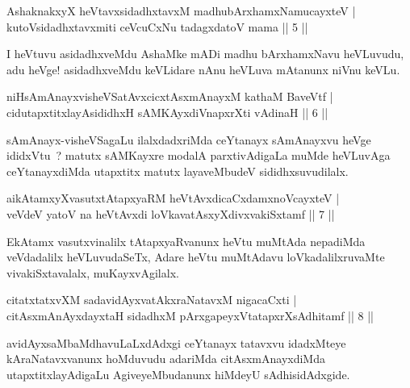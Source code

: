 
\begin{shl}
AshaknakxyX heVtavxsidadhxtavxM madhubArxhamxNamucayxteV |\\
kutoV\s sidadhxtavxmiti ceVcuCxNu tadagxdatoV mama \hfill || 5 ||
\end{shl}

\begin{artha}
I heVtuvu asidadhxveMdu AshaMke mADi madhu bArxhamxNavu heVLuvudu, adu heVge! asidadhxveMdu keVLidare nAnu heVLuva mAtanunx niVnu keVLu.
\end{artha}

\begin{shl}
niHsAmAnayxvisheVSatAvxcicxtAsxmAnayxM kathaM BaveVtf |\\
cidutapxtitxlayAsididhxH sAMKAyxdiVnapxrXti vAdinaH \hfill || 6 ||
\end{shl}

\begin{artha}
sAmAnayx-visheVSagaLu ilalxdadxriMda ceYtanayx sAmAnayxvu heVge ididxVtu~? matutx sAMKayxre modalA parxtivAdigaLa muMde heVLuvAga ceYtanayxdiMda utapxtitx matutx layaveMbudeV sididhxsuvudilalx.
\end{artha}

\begin{shl}
aikAtamxyXvasutxtAtapxyaRM heVtAvxdicaCxdamxnoVcayxteV |\\
veVdeV yatoV na heVtAvxdi loVkavatAsxyXdivxvakiSxtamf \hfill || 7 ||
\end{shl}

\begin{artha}
EkAtamx vasutxvinalilx tAtapxyaRvanunx heVtu muMtAda nepadiMda veVdadalilx heVLuvudaSeTx, Adare heVtu muMtAdavu loVkadalilxruvaMte vivakiSxtavalalx, muKayxvAgilalx.
\end{artha}

\begin{shl}
citatxtatxvXM sadavidAyxvatAkxraNatavxM nigacaCxti |\\
citAsxmAnAyxdayxtaH sidadhxM pArxgapeyxVtatapxrXsAdhitamf \hfill || 8 ||
\end{shl}

\begin{artha}
avidAyxsaMbaMdhavuLaLxdAdxgi ceYtanayx tatavxvu idadxMteye kAraNatavxvanunx hoMduvudu adariMda citAsxmAnayxdiMda utapxtitxlayAdigaLu AgiveyeMbudanunx hiMdeyU sAdhisidAdxgide.
\end{artha}

